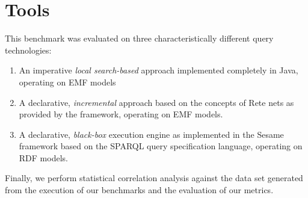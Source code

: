 \section{Tools}

This benchmark was evaluated on three characteristically different query
technologies:
\begin{enumerate}
  \item An imperative \emph{local search-based} approach implemented completely in Java, operating on EMF models
  \item A declarative, \emph{incremental} approach based on the concepts of Rete nets as provided by the \incquery{} framework, operating on EMF models.
  \item A declarative, \emph{black-box} execution engine as implemented in the
  Sesame framework based on the SPARQL query specification language, operating on RDF models.
\end{enumerate}

Finally, we perform statistical correlation analysis against the
data set generated from the execution of our benchmarks and the evaluation of our
metrics.  


